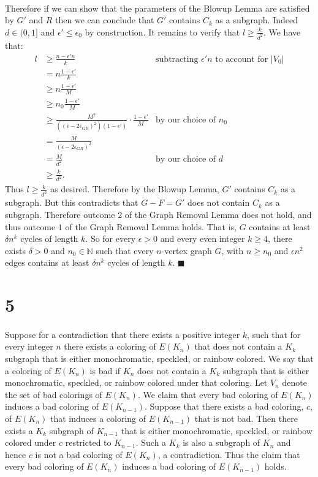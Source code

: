 \documentclass[letterpaper,12pt,oneside,onecolumn]{article}
\newcommand{\N}{\mathbb{N}} \newcommand{\R}{\mathbb{R}}
\begin{document}
\paragraph{}
Therefore if we can show that the parameters of the Blowup Lemma are satisfied by $G'$ and $R$ then we can conclude that $G'$ contains $C_k$ as a subgraph. Indeed $d \in (0,1]$ and $\epsilon' \leq \epsilon_0$ by construction. It remains to verify that $l \geq \frac{k}{d^2}$. We have that:
\begin{align*}
l &\geq \frac{n-\epsilon'n}{k} &\text{subtracting $\epsilon'n$ to account for $|V_0|$}\\
&= n\frac{1-\epsilon'}{k} \\
&\geq n\frac{1-\epsilon'}{M}\\
&\geq n_0 \frac{1-\epsilon'}{M} \\
&\geq \frac{M^2}{((\epsilon-2\epsilon_{GR})^2)(1-\epsilon')} \cdot \frac{1-\epsilon'}{M} &\text{by our choice of $n_0$} \\
&= \frac{M}{(\epsilon-2\epsilon_{GR})^2} \\
&= \frac{M}{d^2} &\text{by our choice of $d$}\\
&\geq \frac{k}{d^2}.
\end{align*}
Thus $l \geq \frac{k}{d^2}$ as desired. Therefore by the Blowup Lemma, $G'$ contains $C_k$ as a subgraph. But this contradicts that $G-F = G'$ does not contain $C_k$ as a subgraph. Therefore outcome $2$ of the Graph Removal Lemma does not hold, and thus outcome $1$ of the Graph Removal Lemma holds. That is, $G$ contains at least $\delta n^k$ cycles of length $k$. So for every $\epsilon > 0$ and every even integer $k \geq 4$, there exists $\delta > 0$ and $n_0 \in \N$ such that every $n$-vertex graph $G$, with $n\geq n_0$ and $\epsilon n^2$ edges contains at least $\delta n^k$ cycles of length $k$. $\blacksquare$
\section*{5}
\paragraph{}
Suppose for a contradiction that there exists a positive integer $k$, such that for every integer $n$ there exists a coloring of $E(K_n)$ that does not contain a $K_k$ subgraph that is either monochromatic, speckled, or rainbow colored. We say that a coloring of $E(K_n)$ is bad if $K_n$ does not contain a $K_k$ subgraph that is either monochromatic, speckled, or rainbow colored under that coloring. Let $V_n$ denote the set of bad colorings of $E(K_n)$. We claim that every bad coloring of $E(K_n)$ induces a bad coloring of $E(K_{n-1})$. Suppose that there exists a bad coloring, $c$, of $E(K_n)$ that induces a coloring of $E(K_{n-1})$ that is not bad. Then there exists a $K_k$ subgraph of $K_{n-1}$ that is either monochromatic, speckled, or rainbow colored under $c$ restricted to $K_{n-1}$. Such a $K_k$ is also a subgraph of $K_n$ and hence $c$ is not a bad coloring of $E(K_n)$, a contradiction. Thus the claim that every bad coloring of $E(K_n)$ induces a bad coloring of $E(K_{n-1})$ holds.
\end{document}
